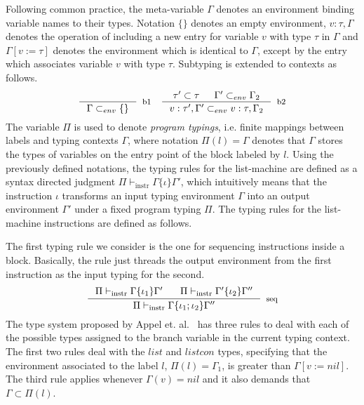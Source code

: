 \documentclass[review]{elsarticle}
\theoremstyle{definition}
\begin{document}
Following common practice, the meta-variable $\Gamma$ denotes an
environment binding variable names to their types. Notation $\{\}$ denotes an empty environment, $v : \tau , \Gamma$
denotes the operation of including a new entry for variable $v$ with type $\tau$
in $\Gamma$ and $\Gamma [v := \tau]$ denotes the environment which is identical to $\Gamma$, except
by the entry which associates variable $v$ with type $\tau$.
Subtyping is extended to contexts as follows.
\[
\begin{array}{cc}
  \inference{}
            {\Gamma \subset_{env} \{\}}[b1]
  &
  \inference{\tau' \subset \tau & \Gamma' \subset_{env} \Gamma_2}
            {v : \tau' , \Gamma' \subset_{env} v : \tau , \Gamma_2}
            [b2]
\end{array}
\]
The variable $\Pi$ is used to denote \emph{program typings}, i.e. finite mappings between
labels and typing contexts $\Gamma$, where notation $\Pi(l) = \Gamma$ denotes that
$\Gamma$ stores the types of variables on the entry point of the block labeled by $l$.
Using the previously defined notations, the typing rules for the list-machine are defined
as a syntax directed judgment $\Pi \vdash_{\text{instr}} \Gamma \{ \iota \} \Gamma'$,
which intuitively means that the instruction $\iota$ transforms an input typing environment
$\Gamma$ into an output environment $\Gamma'$ under a fixed program typing $\Pi$. The typing
rules for the list-machine instructions are defined as follows.

The first typing rule we consider is the one for sequencing instructions inside a block. Basically,
the rule just threads the output environment from the first instruction as the input typing for the
second.
\[
\inference{\Pi \vdash_{\text{instr}} \Gamma\{ \iota_1 \}\Gamma'\:\:\:\:\:\:\:\:\Pi \vdash_{\text{instr}} \Gamma'\{ \iota_2 \}\Gamma''}
          {\Pi \vdash_{\text{instr}} \Gamma\{ \iota_1 ; \iota_2 \}\Gamma''}[seq]
\]
The type system proposed by Appel et. al.~\cite{AppelDL12} has three rules to deal with each of the possible
types assigned to the branch variable in the current typing context. The first two rules deal with the $list$ and $listcon$
types, specifying that the environment associated to the label $l$, $\Pi(l) = \Gamma_1$, is greater than
$\Gamma[v := nil]$. The third rule applies whenever $\Gamma(v) = nil$ and it also demands that $\Gamma \subset \Pi(l)$.
\end{document}

